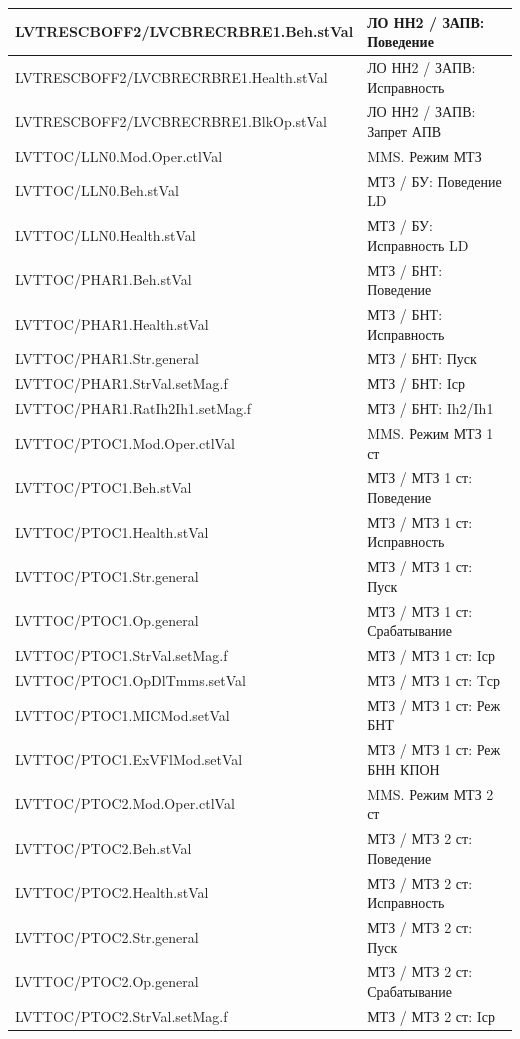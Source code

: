 \begin{longtable}{|>{\raggedright\arraybackslash}m{}|>{\raggedright\arraybackslash}m{}|}
\hline
LVTRESCBOFF2/LVCBRECRBRE1.Beh.stVal & ЛО НН2 / ЗАПВ: Поведение \\
\hline
LVTRESCBOFF2/LVCBRECRBRE1.Health.stVal & ЛО НН2 / ЗАПВ: Исправность \\
\hline
LVTRESCBOFF2/LVCBRECRBRE1.BlkOp.stVal & ЛО НН2 / ЗАПВ: Запрет АПВ \\
\hline
LVTTOC/LLN0.Mod.Oper.ctlVal & MMS. Режим МТЗ \\
\hline
LVTTOC/LLN0.Beh.stVal & МТЗ / БУ: Поведение LD \\
\hline
LVTTOC/LLN0.Health.stVal & МТЗ / БУ: Исправность LD \\
\hline
LVTTOC/PHAR1.Beh.stVal & МТЗ / БНТ: Поведение \\
\hline
LVTTOC/PHAR1.Health.stVal & МТЗ / БНТ: Исправность \\
\hline
LVTTOC/PHAR1.Str.general & МТЗ / БНТ: Пуск \\
\hline
LVTTOC/PHAR1.StrVal.setMag.f & МТЗ / БНТ: Iср \\
\hline
LVTTOC/PHAR1.RatIh2Ih1.setMag.f & МТЗ / БНТ: Ih2/Ih1 \\
\hline
LVTTOC/PTOC1.Mod.Oper.ctlVal & MMS. Режим МТЗ 1 ст \\
\hline
LVTTOC/PTOC1.Beh.stVal & МТЗ / МТЗ 1 ст: Поведение \\
\hline
LVTTOC/PTOC1.Health.stVal & МТЗ / МТЗ 1 ст: Исправность \\
\hline
LVTTOC/PTOC1.Str.general & МТЗ / МТЗ 1 ст: Пуск \\
\hline
LVTTOC/PTOC1.Op.general & МТЗ / МТЗ 1 ст: Срабатывание \\
\hline
LVTTOC/PTOC1.StrVal.setMag.f & МТЗ / МТЗ 1 ст: Iср \\
\hline
LVTTOC/PTOC1.OpDlTmms.setVal & МТЗ / МТЗ 1 ст: Tср \\
\hline
LVTTOC/PTOC1.MICMod.setVal & МТЗ / МТЗ 1 ст: Реж БНТ \\
\hline
LVTTOC/PTOC1.ExVFlMod.setVal & МТЗ / МТЗ 1 ст: Реж БНН КПОН \\
\hline
LVTTOC/PTOC2.Mod.Oper.ctlVal & MMS. Режим МТЗ 2 ст \\
\hline
LVTTOC/PTOC2.Beh.stVal & МТЗ / МТЗ 2 ст: Поведение \\
\hline
LVTTOC/PTOC2.Health.stVal & МТЗ / МТЗ 2 ст: Исправность \\
\hline
LVTTOC/PTOC2.Str.general & МТЗ / МТЗ 2 ст: Пуск \\
\hline
LVTTOC/PTOC2.Op.general & МТЗ / МТЗ 2 ст: Срабатывание \\
\hline
LVTTOC/PTOC2.StrVal.setMag.f & МТЗ / МТЗ 2 ст: Iср \\

\end{longtable}
